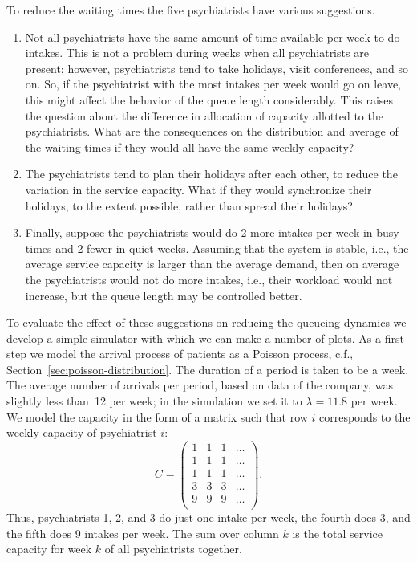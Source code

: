 To reduce the waiting times the five psychiatrists have various
suggestions. 
\begin{enumerate}
\item Not all psychiatrists have the same amount of time available per
  week to do intakes. This is not a problem during weeks when all psychiatrists are
  present; however, psychiatrists tend to take holidays, visit
  conferences, and so on. So, if the psychiatrist with the most
  intakes per week would go on leave, this might affect the behavior
  of the queue length considerably. This raises the question about the difference
  in allocation of capacity allotted to the psychiatrists. What are
  the consequences on the distribution and average of the waiting
  times if they would all have the same weekly capacity?
\item The psychiatrists tend to plan their holidays after each
  other, to reduce the variation in the service capacity. What if they
  would synchronize their holidays, to the extent possible, rather
  than spread their holidays? 
\item Finally, suppose the psychiatrists would do 2 more intakes per
  week in busy times and 2 fewer in quiet weeks. Assuming that the
  system is stable, i.e., the average service capacity is larger than the average demand,
  then on average the psychiatrists would not do more intakes, i.e.,
  their workload would not increase, but the queue length may be
  controlled better.
\end{enumerate}


To evaluate the effect of these suggestions on reducing the queueing
dynamics we develop a simple simulator with which we can make a number of plots. 
As a first step we model the arrival process of patients as a Poisson
process, c.f., Section~\ref{sec:poisson-distribution}. The duration of
a period is taken to be a week. The average number of arrivals per
period, based on data of the company, was slightly less than~12 per
week; in the simulation we set it to $\lambda= 11.8$ per week. We
model the capacity in the form of a matrix such that row $i$
corresponds to the weekly capacity of psychiatrist $i$:
\begin{equation*}
C = 
  \begin{pmatrix}
    1 & 1 & 1 & \ldots\\
    1 & 1 & 1 & \ldots\\
    1 & 1 & 1 & \ldots\\
    3 & 3 & 3 & \ldots\\
    9 & 9 & 9 & \ldots\\
  \end{pmatrix}.
\end{equation*}
Thus, psychiatrists 1, 2, and 3 do just one intake per week, the
fourth does 3, and the fifth does 9 intakes per week. The sum over
column $k$ is the total service capacity for week $k$ of all
psychiatrists together.

